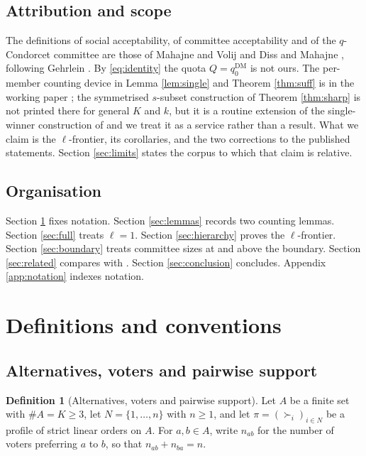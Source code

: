 \documentclass[11pt]{article}
\theoremstyle{plain}
\theoremstyle{definition}
\newtheorem{definition}{Definition}
\newcommand{\DM}{\mathrm{DM}}
\begin{document}
\subsection{Attribution and scope}
\label{sec:attrib}

The definitions of social acceptability, of committee acceptability and of the $q$-Condorcet committee are those of Mahajne and Volij \cite{MahajneVolij2018} and Diss and Mahajne \cite{DissMahajne2019,DissMahajne2020}, following Gehrlein \cite{Gehrlein1985}. By \eqref{eq:identity} the quota $Q=q_0^{\DM}$ is not ours. The per-member counting device in Lemma \ref{lem:single} and Theorem \ref{thm:suff} is in the working paper \cite{DissMahajne2019}; the sym\-metrised $s$-subset construction of Theorem \ref{thm:sharp} is not printed there for general $K$ and $k$, but it is a routine extension of the single-winner construction of \cite{MahajneVolij2019} and we treat it as a service rather than a result. What we claim is the $\ell$-frontier, its corollaries, and the two corrections to the published statements. Section \ref{sec:limits} states the corpus to which that claim is relative.

\subsection{Organisation}

Section \ref{sec:defs} fixes notation. Section \ref{sec:lemmas} records two counting lemmas. Section \ref{sec:full} treats $\ell=1$. Section \ref{sec:hierarchy} proves the $\ell$-frontier. Section \ref{sec:boundary} treats committee sizes at and above the boundary. Section \ref{sec:related} compares with \cite{DissMahajne2020}. Section \ref{sec:conclusion} concludes. Appendix \ref{app:notation} indexes notation.

\section{Definitions and conventions}
\label{sec:defs}

\subsection{Alternatives, voters and pairwise support}

\begin{definition}[Alternatives, voters and pairwise support]
\label{def:framework}
Let $A$ be a finite set with $\#\!A=K\ge3$, let $N=\{1,\dots,n\}$ with $n\ge1$, and let $\pi=(\succ_i)_{i\in N}$ be a profile of strict linear orders on $A$. For $a,b\in A$, write $n_{ab}$ for the number of voters preferring $a$ to $b$, so that $n_{ab}+n_{ba}=n$.
\end{definition}
\end{document}

